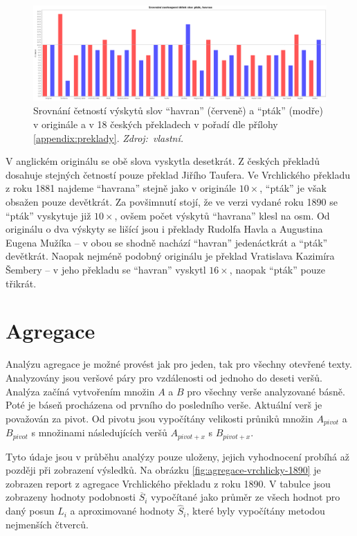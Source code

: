 \documentclass[dp.tex]{subfiles}
\begin{document}
\begin{figure}[h!]
	\centering
	\includegraphics[max width=\textwidth,keepaspectratio=true]{imgs-70-prakticka/cetnost-slov-orig}
	\caption[Srovnání četností výskytů slov \enquote{havran} a \enquote{pták} v originále a v 18 českých překladech.]{Srovnání četností výskytů slov \enquote{havran} (červeně) a \enquote{pták} (modře) v originále a v 18 českých překladech v pořadí dle přílohy \ref{appendix:preklady}. \textit{Zdroj:~vlastní.}}
	\label{fig:word-freq-compare}
\end{figure}

V anglickém originálu se obě slova vyskytla desetkrát. Z českých překladů dosahuje stejných četností pouze překlad Jiřího Taufera. Ve Vrchlického překladu z roku 1881 najdeme \enquote{havrana} stejně jako v originále $10\times$, \enquote{pták} je však obsažen pouze devětkrát. Za povšimnutí stojí, že ve verzi vydané roku 1890 se \enquote{pták} vyskytuje již $10\times$, ovšem počet výskytů \enquote{havrana} klesl na osm. Od originálu o dva výskyty se lišící jsou i překlady Rudolfa Havla a Augustina Eugena Mužíka -- v obou se shodně nachází \enquote{havran} jedenáctkrát a \enquote{pták} devětkrát. Naopak nejméně podobný originálu je překlad Vratislava Kazimíra Šembery -- v jeho překladu se \enquote{havran} vyskytl $16\times$, naopak \enquote{pták} pouze třikrát.

\section{Agregace}

Analýzu agregace je možné provést jak pro jeden, tak pro všechny otevřené texty. Analyzovány jsou veršové páry pro vzdálenosti od jednoho do deseti veršů. Analýza začíná vytvořením množin $A$ a $B$ pro všechny verše analyzované básně. Poté je báseň procházena od prvního do posledního verše. Aktuální verš je považován za pivot. Od pivotu jsou vypočítány velikosti průniků množin $A_{pivot}$ a $B_{pivot}$ s množinami následujících veršů $A_{pivot + x}$  s $B_{pivot + x}$. 

Tyto údaje jsou v průběhu analýzy pouze uloženy, jejich vyhodnocení probíhá až později při zobrazení výsledků. Na obrázku \ref{fig:agregace-vrchlicky-1890} je zobrazen report z agregace Vrchlického překladu z roku 1890. V tabulce jsou zobrazeny hodnoty podobnosti $\overline{S}_i$ vypočítané jako průměr ze všech hodnot pro daný posun $L_i$ a aproximované hodnoty $\hat{S}_i$, které byly vypočítány metodou nejmenších čtverců.
\end{document}
